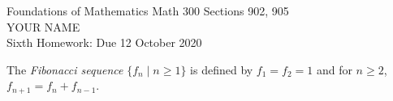 \documentclass[12pt]{article}
\newcommand{\defn}[1]{{\color{blue}\sl #1}}
\begin{document}
\LARGE 
\noindent
{\color{Maroon}Foundations of Mathematics \hfill Math 300 Sections 902, 905}\vspace{2pt}\\
\Large YOUR NAME\vspace{2pt}\\
\large
Sixth Homework: \hfill Due 12 October 2020
\normalsize    %
\vspace{10pt}  %

\noindent{\color{blue}\rule{500pt}{2pt}}


The \defn{Fibonacci sequence} $\{f_n\mid n\geq 1\}$ is defined by $f_1=f_2=1$ and for $n\geq 2$, $f_{n+1}=f_{n}+f_{n-1}$.
\end{document}
